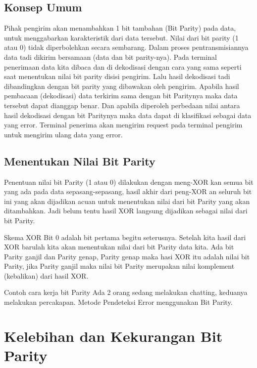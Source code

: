 \subsection{Konsep Umum}
Pihak pengirim akan menambahkan 1 bit tambahan (Bit Parity) pada data, untuk menggabarkan karakteristik dari data tersebut. Nilai dari bit parity (1 atau 0) tidak diperbolehkan secara sembarang. Dalam proses pentransmisiannya data tadi dikirim bersamaan (data dan bit parity-nya). Pada terminal penerimaan data kita dibaca dan di dekodisasi dengan cara yang sama seperti saat menentukan nilai bit parity disisi pengirim. Lalu hasil dekodisasi tadi dibandingkan dengan bit parity yang dibawakan oleh pengirim.
Apabila hasil pembacaan (dekodisasi) data terkirim sama dengan bit Paritynya maka data tersebut dapat dianggap benar. Dan apabila diperoleh perbedaan nilai antara hasil dekodisasi dengan bit Paritynya maka data dapat di klasifikasi sebagai data yang error. Terminal penerima akan mengirim request pada terminal pengirim untuk mengirim ulang data yang error.
 
\subsection{Menentukan Nilai Bit Parity}
Penentuan nilai bit Parity (1 atau 0) dilakukan dengan meng-XOR kan semua bit yang ada pada data sepasang-sepasang, hasil akhir dari peng-XOR an seluruh bit ini yang akan dijadikan acuan untuk menentukan nilai dari bit Parity yang akan ditambahkan. Jadi belum tentu hasil XOR langsung dijadikan sebagai nilai dari bit Parity.

Skema XOR
 Bit 0 adalah bit pertama begitu seterusnya. Setelah kita hasil dari XOR barulah kita akan menentukan nilai dari bit Parity data kita. Ada bit Parity ganjil dan Parity genap, Parity genap maka hasi XOR itu adalah nilai bit Parity, jika Parity ganjil maka nilai bit Parity merupakan nilai komplement (kebalikan) dari hasil XOR.

Contoh cara kerja bit Parity
Ada 2 orang sedang melakukan chatting, keduanya melakukan percakapan. Metode Pendeteksi Error menggunakan Bit Parity.




\section{Kelebihan dan Kekurangan Bit Parity}
